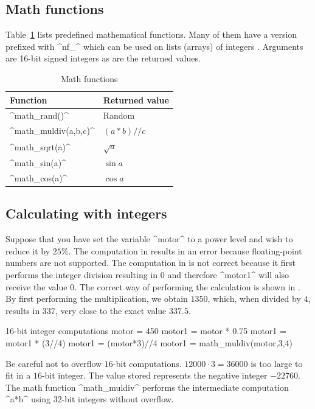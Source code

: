 \documentclass[11pt,a4paper]{article}
\newcommand*{\li}[1]{{\footnotesize\textsf{\ddag #1}}}
\begin{document}
\subsection{Math functions}

Table~\ref{t.math} lists predefined mathematical functions. Many of them have a version prefixed with ^nf_^ which can be used on lists (arrays) of integers \cite{native}. Arguments are 16-bit signed integers as are the returned values.

\begin{table}[htb]
\renewcommand{\arraystretch}{.85}
\begin{center}
\begin{tabular}{|l|l|}
\hline
Function& Returned value\\\hline
^math_rand()^& Random\\
^math_muldiv(a,b,c)^& $(a*b)//c$ \\
^math_sqrt(a)^&$\sqrt{a}$\\
\hline
^math_sin(a)^&$\sin a$\\
^math_cos(a)^&$\cos a$\\
\hline
\end{tabular}
\end{center}
\caption{Math functions}\label{t.math}
\end{table}

\subsection{Calculating with integers}

Suppose that you have set the variable ^motor^ to a power level and wish to reduce it by $25\%$. The computation in \li{2} results in an error because floating-point numbers are not supported. The computation in \li{3} is not correct because it first performs the integer division resulting in $0$ and therefore ^motor1^ will also receive the value $0$. The correct way of performing the calculation is shown in \li{4}. By first performing the multiplication, we obtain $1350$, which, when divided by $4$, results in $337$, very close to the exact value $337.5$.

\begin{progln}{16-bit integer computations}
motor = 450
motor1 = motor * 0.75
motor1 = motor1 * (3//4)
motor1 = (motor*3)//4
motor1 = math_muldiv(motor,3,4)
\end{progln}

Be careful not to overflow $16$-bit computations. $12000\cdot 3=36000$ is too large to fit in a $16$-bit integer. The value stored represents the negative integer $-22760$.  The math function ^math_muldiv^ \li{5} performs the intermediate computation ^a*b^ using 32-bit integers without overflow.
\end{document}
